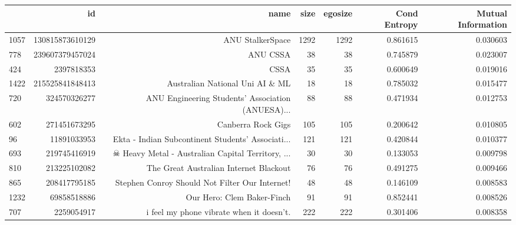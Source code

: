 \begin{table}
\begin{tabular}{| >{\small}l | >{\small}r | >{\small}r | >{\small}r | >{\small}r | >{\small}r |>{\small}r |}
\hline
{} &               id &                                               name &  size &  egosize &  Cond Entropy &  Mutual Information \\
\hline
1057 &  130815873610129 &                                   ANU StalkerSpace &  1292 &     1292 &             0.861615 &            0.030603 \\
778  &  239607379457024 &                                           ANU CSSA &    38 &       38 &             0.745879 &            0.023007 \\
424  &       2397818353 &                                               CSSA &    35 &       35 &             0.600649 &            0.019016 \\
1422 &  215525841848413 &                    Australian National Uni AI \& ML &    18 &       18 &             0.785032 &            0.015477 \\
720  &     324570326277 &  ANU Engineering Students' Association (ANUESA)... &    88 &       88 &             0.471934 &            0.012753 \\
602  &     271451673295 &                                 Canberra Rock Gigs &   105 &      105 &             0.200642 &            0.010805 \\
96   &      11891033953 &  Ekta - Indian Subcontinent Students' Associati... &   121 &      121 &             0.420844 &            0.010377 \\
693  &     219745416919 &  ☠ Heavy Metal - Australian Capital Territory, ... &    30 &       30 &             0.133053 &            0.009798 \\
810  &     213225102082 &             The Great Australian Internet Blackout &    76 &       76 &             0.491275 &            0.009466 \\
865  &     208417795185 &     Stephen Conroy Should Not Filter Our Internet! &    48 &       48 &             0.146109 &            0.008583 \\
1232 &      69858518886 &                         Our Hero: Clem Baker-Finch &    91 &       91 &             0.852441 &            0.008526 \\
707  &       2259054917 &           i feel my phone vibrate when it doesn't. &   222 &      222 &             0.301406 &            0.008358 \\

\end{tabular}
\end{table}
